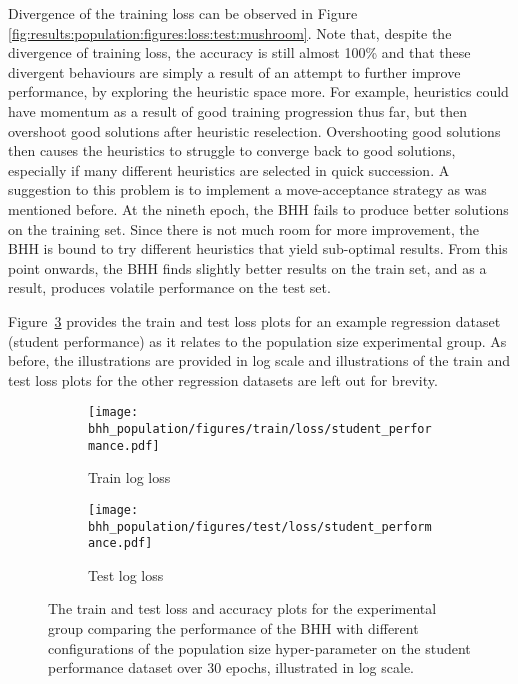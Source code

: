 Divergence of the training loss can be observed in Figure \ref{fig:results:population:figures:loss:test:mushroom}. Note that, despite the divergence of training loss, the accuracy is still almost 100\% and that these divergent behaviours are simply a result of an attempt to further improve performance, by exploring the heuristic space more. For example, heuristics could have momentum as a result of good training progression thus far, but then overshoot good solutions after heuristic reselection. Overshooting good solutions then causes the heuristics to struggle to converge back to good solutions, especially if many different heuristics are selected in quick succession. A suggestion to this problem is to implement a move-acceptance strategy as was mentioned before. At the nineth epoch, the \acs{BHH} fails to produce better solutions on the training set. Since there is not much room for more improvement, the \acs{BHH} is bound to try different heuristics that yield sub-optimal results. From this point onwards, the \acs{BHH} finds slightly better results on the train set, and as a result, produces volatile performance on the test set.

Figure~\ref{fig:results:population:figures:student_performance} provides the train and test loss plots for an example regression dataset (student performance) as it relates to the population size experimental group. As before, the illustrations are provided in log scale and illustrations of the train and test loss plots for the other regression datasets are left out for brevity.

\begin{figure}[htbp]
      \begin{subfigure}{0.5\textwidth}
            \centering
            \texttt{[image: bhh\_population/figures/train/loss/student\_performance.pdf]}
            \caption{Train log loss}
            \label{fig:results:population:figures:loss:train:student_performance}
      \end{subfigure}
      \begin{subfigure}{0.5\textwidth}
            \centering
            \texttt{[image: bhh\_population/figures/test/loss/student\_performance.pdf]}
            \caption{Test log loss}
            \label{fig:results:population:figures:loss:test:student_performance}
      \end{subfigure}
      \par\bigskip
      \caption{The train and test loss and accuracy plots for the experimental group comparing the performance of the \acs{BHH} with different configurations of the population size hyper-parameter on the student performance dataset over 30 epochs, illustrated in log scale.}
      \label{fig:results:population:figures:student_performance}
\end{figure}


